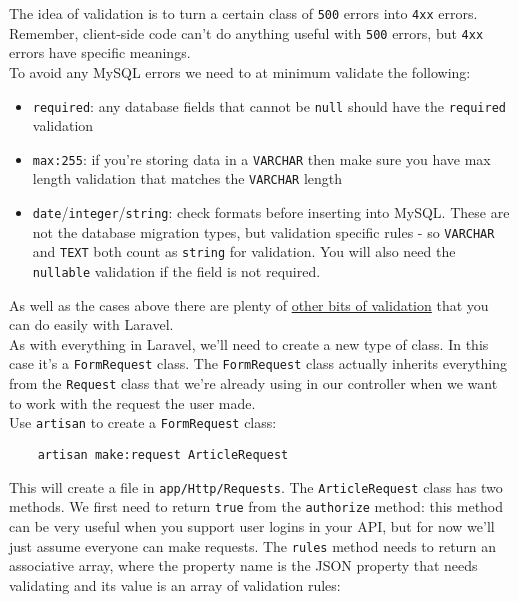 The idea of validation is to turn a certain class of \texttt{500} errors into \texttt{4xx} errors. Remember, client-side code can't do anything useful with \texttt{500} errors, but \texttt{4xx} errors have specific meanings.
\\

To avoid any MySQL errors we need to at minimum validate the following:

\begin{itemize}
    \item \texttt{required}: any database fields that cannot be \texttt{null} should have the \texttt{required} validation
    \item \texttt{max:255}: if you're storing data in a \texttt{VARCHAR} then make sure you have max length validation that matches the \texttt{VARCHAR} length
    \item \texttt{date}/\texttt{integer}/\texttt{string}: check formats before inserting into MySQL. These are not the database migration types, but validation specific rules - so \texttt{VARCHAR} and \texttt{TEXT} both count as \texttt{string} for validation. You will also need the \texttt{nullable} validation if the field is not required.
\end{itemize}

As well as the cases above there are plenty of \href{http://laravel.com/docs/master/validation#available-validation-rules}{other bits of validation} that you can do easily with Laravel.
\\

As with everything in Laravel, we'll need to create a new type of class. In this case it's a \texttt{FormRequest} class. The \texttt{FormRequest} class actually inherits everything from the \texttt{Request} class that we're already using in our controller when we want to work with the request the user made.
\\

Use \texttt{artisan} to create a \texttt{FormRequest} class:

\begin{verbatim}
    artisan make:request ArticleRequest
\end{verbatim}

This will create a file in \texttt{app/Http/Requests}. The \texttt{ArticleRequest} class has two methods. We first need to return \texttt{true} from the \texttt{authorize} method: this method can be very useful when you support user logins in your API, but for now we'll just assume everyone can make requests. The \texttt{rules} method needs to return an associative array, where the property name is the JSON property that needs validating and its value is an array of validation rules:

